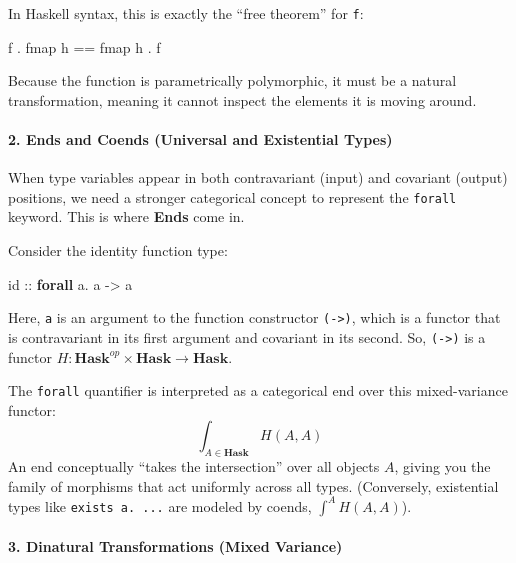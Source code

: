 \documentclass[
]{article}
\newenvironment{Shaded}{}{}
\newcommand{\FunctionTok}[1]{\textcolor[rgb]{0.02,0.16,0.49}{#1}}
\newcommand{\KeywordTok}[1]{\textcolor[rgb]{0.00,0.44,0.13}{\textbf{#1}}}
\newcommand{\NormalTok}[1]{#1}
\newcommand{\OperatorTok}[1]{\textcolor[rgb]{0.40,0.40,0.40}{#1}}
\newcommand{\OtherTok}[1]{\textcolor[rgb]{0.00,0.44,0.13}{#1}}
\begin{document}
In Haskell syntax, this is exactly the ``free theorem'' for \texttt{f}:

\begin{Shaded}
\begin{Highlighting}[]
\NormalTok{f }\OperatorTok{.} \FunctionTok{fmap}\NormalTok{ h }\OperatorTok{==} \FunctionTok{fmap}\NormalTok{ h }\OperatorTok{.}\NormalTok{ f}
\end{Highlighting}
\end{Shaded}

Because the function is parametrically polymorphic, it must be a natural
transformation, meaning it cannot inspect the elements it is moving
around.

\paragraph{2. Ends and Coends (Universal and Existential
Types)}\label{ends-and-coends-universal-and-existential-types}

When type variables appear in both contravariant (input) and covariant
(output) positions, we need a stronger categorical concept to represent
the \texttt{forall} keyword. This is where \textbf{Ends} come in.

Consider the identity function type:

\begin{Shaded}
\begin{Highlighting}[]
\FunctionTok{id}\OtherTok{ ::} \KeywordTok{forall}\NormalTok{ a}\OperatorTok{.}\NormalTok{ a }\OtherTok{{-}\textgreater{}}\NormalTok{ a}
\end{Highlighting}
\end{Shaded}

Here, \texttt{a} is an argument to the function constructor
\texttt{(-\textgreater{})}, which is a functor that is contravariant in
its first argument and covariant in its second. So,
\texttt{(-\textgreater{})} is a functor
\(H : \mathbf{Hask}^{op} \times \mathbf{Hask} \to \mathbf{Hask}\).

The \texttt{forall} quantifier is interpreted as a categorical end over
this mixed-variance functor: \[ \int_{A \in \mathbf{Hask}} H(A, A) \] An
end conceptually ``takes the intersection'' over all objects \(A\),
giving you the family of morphisms that act uniformly across all types.
(Conversely, existential types like \texttt{exists\ a.\ ...} are modeled
by coends, \(\int^{A} H(A, A)\)).

\paragraph{3. Dinatural Transformations (Mixed
Variance)}\label{dinatural-transformations-mixed-variance}
\end{document}
